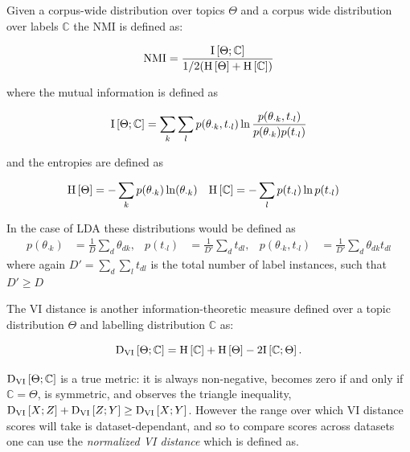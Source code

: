 \newcommand{\TopDist}{\Theta}
\newcommand{\LabDist}{\mathbb{C}}
\newcommand{\NMI}{\text{NMI}}

Given a corpus-wide distribution over topics $\TopDist$ and a corpus wide distribution over labels $\LabDist$ the NMI is defined as:

\begin{equation}
\NMI = \frac{\mut{\TopDist}{\LabDist}}{1/2(\ent{\TopDist} + \ent{\LabDist})}
\end{equation}

where the mutual information is defined as

\begin{equation}
\mut{\TopDist}{\LabDist} = \sum_k \sum_l p(\theta_{\cdot k}, t_{\cdot l}) \ln \frac{p(\theta_{\cdot k}, t_{\cdot l})}{p(\theta_{\cdot k})p(t_{\cdot l})}
\end{equation}

and the entropies are defined as

\begin{align}
\ent{\TopDist} & = - \sum_k p(\theta_{\cdot k}) \ln (\theta_{\cdot k}) &
\ent{\LabDist} & = - \sum_l p(t_{\cdot l}) \ln p(t_{\cdot l})
\end{align}

In the case of LDA these distributions would be defined as
\begin{align}
p(\theta_{\cdot k}) & =  \frac{1}{D} \sum_d \theta_{dk} ,&
p(t_{\cdot l}) &= \frac{1}{D'} \sum_d t_{dl} ,& 
p(\theta_{\cdot k}, t_{\cdot l}) & = \frac{1}{D'} \sum_d \theta_{dk} t_{dl}
\end{align}
where again $D' = \sum_d \sum_l t_{dl}$ is the total number of label instances, such that $D' \geq D$


The VI distance\cite{Meila2003} is another information-theoretic measure defined over a topic distribution $\TopDist$ and labelling distribution $\LabDist$ as:

\begin{equation}
\dvi{\TopDist}{\LabDist} = \ent{\LabDist} + \ent{\TopDist} - 2 \mut{\LabDist}{\TopDist}.
\end{equation}

$\dvi{\TopDist}{\LabDist}$ is a true metric: it is always non-negative, becomes zero if and only if $\LabDist = \TopDist$, is symmetric, and observes the triangle inequality, $\text{D}_\text{VI} \left[ X; Z \right] + \text{D}_\text{VI} \left[ Z; Y \right] \geq \text{D}_\text{VI} \left[ X; Y \right]$. However the range over which VI distance scores will take is dataset-dependant, and so to compare scores across datasets one can use the \emph{normalized VI distance}\cite{Reichart2009} which is defined as. 

